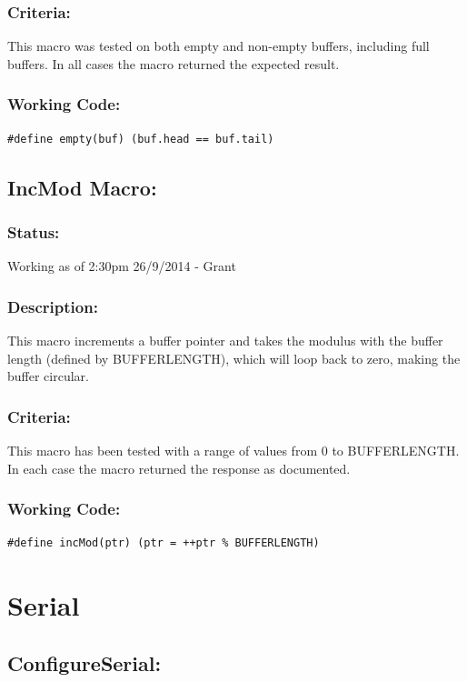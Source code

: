 \documentclass[]{report}
\begin{document}
\subsubsection{Criteria:}
This macro was tested on both empty and non-empty buffers, including full buffers. In all cases the macro returned the expected result.

\subsubsection{Working Code:}
\begin{lstlisting}
#define empty(buf) (buf.head == buf.tail)
\end{lstlisting}

\subsection{IncMod Macro:}
\subsubsection{Status:}
Working as of 2:30pm 26/9/2014 - Grant

\subsubsection{Description:}
This macro increments a buffer pointer and takes the modulus with the buffer length (defined by BUFFERLENGTH), which will loop back to zero, making the buffer circular.

\subsubsection{Criteria:}
This macro has been tested with a range of values from 0 to BUFFERLENGTH. In each case the macro returned the response as documented.

\subsubsection{Working Code:}
\begin{lstlisting}
#define incMod(ptr) (ptr = ++ptr % BUFFERLENGTH)
\end{lstlisting}

\newpage
\section{Serial}


\subsection{ConfigureSerial:}
\end{document}
